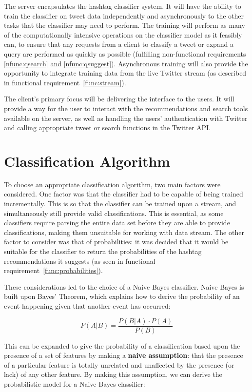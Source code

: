 \documentclass[11pt,a4paper]{report}
\begin{document}
The server encapsulates the hashtag classifier system. It will have the ability to train the classifier on tweet data independently and asynchronously to the other tasks that the classifier may need to perform. The training will perform as many of the computationally intensive operations on the classifier model as it feasibly can, to ensure that any requests from a client to classify a tweet or expand a query are performed as quickly as possible (fulfilling non-functional requirements \ref{nfunc:qsearch} and \ref{nfunc:qsuggest}). Asynchronous training will also provide the opportunity to integrate training data from the live Twitter stream (as described in functional requirement~\ref{func:stream}).

The client's primary focus will be delivering the interface to the users. It will provide a way for the user to interact with the recommendations and search tools available on the server, as well as handling the users' authentication with Twitter and calling appropriate tweet or search functions in the Twitter API.

\section{Classification Algorithm}
To choose an appropriate classification algorithm, two main factors were considered. One factor was that the classifier had to be capable of being trained incrementally. This is so that the classifier can be trained upon a stream, and simultaneously still provide valid classifications. This is essential, as some classifiers require parsing the entire data set before they are able to provide classifications, making them unsuitable for working with data stream. The other factor to consider was that of probabilities: it was decided that it would be suitable for the classifier to return the probabilities of the hashtag recommendations it suggests (as seen in functional requirement~\ref{func:probabilities}).

These considerations led to the choice of a Naive Bayes classifier. Naive Bayes is built upon Bayes' Theorem, which explains how to derive the probability of an event happening given that another event has occurred:

\begin{equation}
    P(A|B) = \frac{P(B|A) \cdot P(A)}{P(B)}
\end{equation}

This can be expanded to give the probability of a classification based upon the presence of a set of features by making a \textbf{naive assumption}: that the presence of a particular feature is totally unrelated and unaffected by the presence (or lack) of any other feature. By making this assumption, we can derive the probabilistic model for a Naive Bayes classifier:
\end{document}
